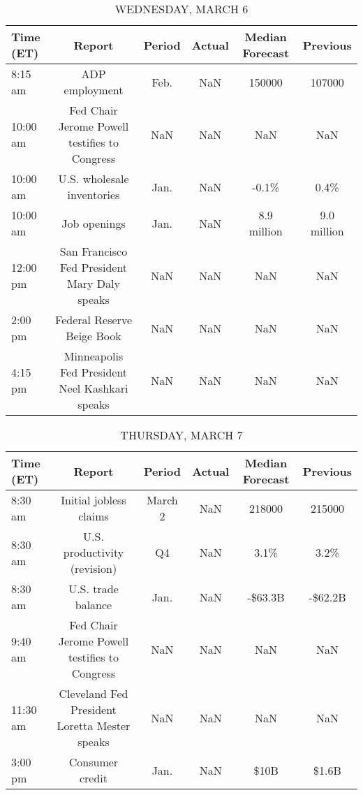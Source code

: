 \documentclass{article}%
\begin{document}
\begin{table}[htbp]%
\caption{WEDNESDAY, MARCH 6}%
\centering%
\begin{adjustbox}{width=1\textwidth}%
\begin{tabular}{lccccc}
\toprule
Time (ET) &                                         Report & Period & Actual & Median Forecast &    Previous \\
\midrule
  8:15 am &                                 ADP employment &   Feb. &    NaN &          150000 &      107000 \\
 10:00 am &  Fed Chair Jerome Powell testifies to Congress &    NaN &    NaN &             NaN &         NaN \\
 10:00 am &                     U.S. wholesale inventories &   Jan. &    NaN &           -0.1\% &        0.4\% \\
 10:00 am &                                   Job openings &   Jan. &    NaN &     8.9 million & 9.0 million \\
 12:00 pm &   San Francisco Fed President Mary Daly speaks &    NaN &    NaN &             NaN &         NaN \\
  2:00 pm &                     Federal Reserve Beige Book &    NaN &    NaN &             NaN &         NaN \\
  4:15 pm & Minneapolis Fed President Neel Kashkari speaks &    NaN &    NaN &             NaN &         NaN \\
\bottomrule
\end{tabular}
%
\end{adjustbox}%
\end{table}

%


\begin{table}[htbp]%
\caption{THURSDAY, MARCH 7}%
\centering%
\begin{adjustbox}{width=1\textwidth}%
\begin{tabular}{lccccc}
\toprule
Time (ET) &                                        Report &  Period & Actual & Median Forecast & Previous \\
\midrule
  8:30 am &                        Initial jobless claims & March 2 &    NaN &          218000 &   215000 \\
  8:30 am &                  U.S. productivity (revision) &      Q4 &    NaN &            3.1\% &     3.2\% \\
  8:30 am &                            U.S. trade balance &    Jan. &    NaN &         -\$63.3B &  -\$62.2B \\
  9:40 am & Fed Chair Jerome Powell testifies to Congress &     NaN &    NaN &             NaN &      NaN \\
 11:30 am & Cleveland Fed President Loretta Mester speaks &     NaN &    NaN &             NaN &      NaN \\
  3:00 pm &                               Consumer credit &    Jan. &    NaN &            \$10B &    \$1.6B \\
\bottomrule
\end{tabular}
%
\end{adjustbox}%
\end{table}
\end{document}

